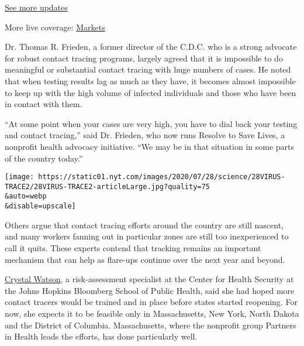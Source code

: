 \href{https://www.nytimes.com/2020/08/01/world/coronavirus-covid-19.html?action=click\&pgtype=Article\&state=default\&region=MAIN_CONTENT_1\&context=storylines_live_updates}{See
more updates}

More live coverage:
\href{https://www.nytimes.com/live/2020/07/31/business/stock-market-today-coronavirus?action=click\&pgtype=Article\&state=default\&region=MAIN_CONTENT_1\&context=storylines_live_updates}{Markets}

Dr. Thomas R. Frieden, a former director of the C.D.C. who is a strong
advocate for robust contact tracing programs, largely agreed that it is
impossible to do meaningful or substantial contact tracing with huge
numbers of cases. He noted that when testing results lag as much as they
have, it becomes almost impossible to keep up with the high volume of
infected individuals and those who have been in contact with them.

``At some point when your cases are very high, you have to dial back
your testing and contact tracing,'' said Dr. Frieden, who now runs
Resolve to Save Lives, a nonprofit health advocacy initiative. ``We may
be in that situation in some parts of the country today.''

\texttt{[image: https://static01.nyt.com/images/2020/07/28/science/28VIRUS-TRACE2/28VIRUS-TRACE2-articleLarge.jpg?quality=75\\\&auto=webp\\\&disable=upscale]}

Others argue that contact tracing efforts around the country are still
nascent, and many workers fanning out in particular zones are still too
inexperienced to call it quits. These experts contend that tracking
remains an important mechanism that can help as flare-ups continue over
the next year and beyond.

\href{https://www.centerforhealthsecurity.org/our-people/C\%20Watson/}{Crystal
Watson}, a risk-assessment specialist at the Center for Health Security
at the Johns Hopkins Bloomberg School of Public Health, said she had
hoped more contact tracers would be trained and in place before states
started reopening. For now, she expects it to be feasible only in
Massachusetts, New York, North Dakota and the District of Columbia.
Massachusetts, where the nonprofit group Partners in Health leads the
efforts, has done particularly well.

